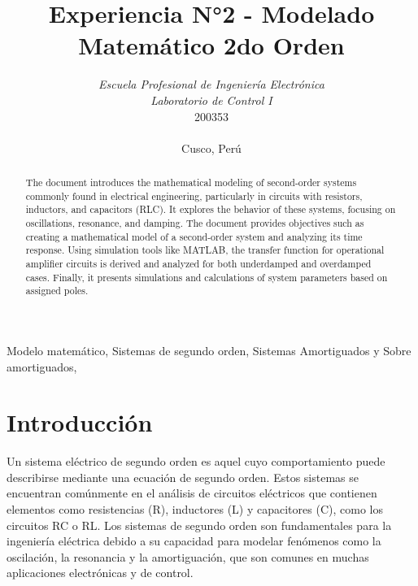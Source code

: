 \documentclass[conference]{IEEEtran}
\begin{document}
	
	\title{Experiencia N°2 - Modelado Matemático 2do Orden}
	\author{	
		\textit{Escuela Profesional de Ingeniería Electrónica}\\
		\textit{Laboratorio de Control I}\\
		200353 \\\\
		Cusco, Perú
	}
	
	\maketitle
	
	\begin{abstract}
	The document introduces the mathematical modeling of second-order systems commonly found in electrical engineering, particularly in circuits with resistors, inductors, and capacitors (RLC). It explores the behavior of these systems, focusing on oscillations, resonance, and damping. The document provides objectives such as creating a mathematical model of a second-order system and analyzing its time response. Using simulation tools like MATLAB, the transfer function for operational amplifier circuits is derived and analyzed for both underdamped and overdamped cases. Finally, it presents simulations and calculations of system parameters based on assigned poles.
	\end{abstract}
	
	\begin{IEEEkeywords}
	Modelo matemático, Sistemas de segundo orden, Sistemas Amortiguados y Sobre amortiguados, 
	\end{IEEEkeywords}
	
	\section{Introducción}
	Un sistema eléctrico de segundo orden es aquel cuyo comportamiento puede describirse mediante una ecuación de segundo orden. Estos sistemas se encuentran comúnmente en el análisis de circuitos eléctricos que contienen elementos como resistencias (R), inductores (L) y capacitores (C), como los circuitos RC o RL. Los sistemas de segundo orden son fundamentales para la ingeniería eléctrica debido a su capacidad para modelar fenómenos como la oscilación, la resonancia y la amortiguación, que son comunes en muchas aplicaciones electrónicas y de control.
	
\end{document}
